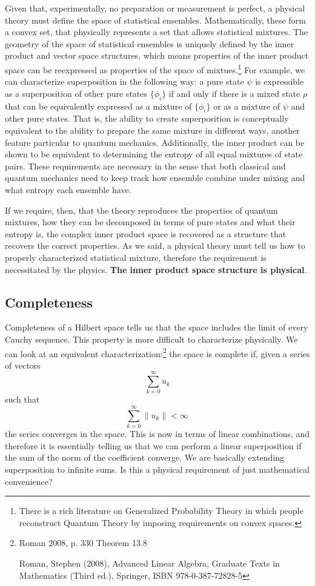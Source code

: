 \documentclass[10pt,twocolumn, nofootinbib]{revtex4-2}
\begin{document}
Given that, experimentally, no preparation or measurement is perfect, a physical theory must define the space of statistical ensembles. Mathematically, these form a convex set, that physically represents a set that allows statistical mixtures. The geometry of the space of statistical ensembles is uniquely defined by the inner product and vector space structures, which means properties of the inner product space can be reexpressed as properties of the space of mixtues.\footnote{There is a rich literature on Generalized Probability Theory in which people reconstruct Quantum Theory by imposing requirements on convex spaces.} For example, we can characterize superposition in the following way: a pure state $\psi$ is expressible as a superposition of other pure states $\{\phi_i\}$ if and only if there is a mixed state $\rho$ that can be equivalently expressed as a mixture of $\{\phi_i\}$ or as a mixture of $\psi$ and other pure states. That is, the ability to create superposition is conceptually equivalent to the ability to prepare the same mixture in different ways, another feature particular to quantum mechanics. Additionally, the inner product can be shown to be equivalent to determining the entropy of all equal mixtures of state pairs. These requirements are necessary in the sense that both classical and quantum mechanics need to keep track how ensemble combine under mixing and what entropy each ensemble have.

If we require, then, that the theory reproduces the properties of quantum mixtures, how they can be decomposed in terms of pure states and what their entropy is, the complex inner product space is recovered as a structure that recovers the correct properties. As we said, a physical theory must tell us how to properly characterized statistical mixture, therefore the requirement is necessitated by the physics. \textbf{The inner product space structure is physical}.

\subsection{Completeness}

Completeness of a Hilbert space tells us that the space includes the limit of every Cauchy sequence. This property is more difficult to characterize physically. We can look at an equivalent characterization:\footnote{Roman 2008, p. 330 Theorem 13.8
	
	Roman, Stephen (2008), Advanced Linear Algebra, Graduate Texts in Mathematics (Third ed.), Springer, ISBN 978-0-387-72828-5} the space is complete if, given a series of vectors
$$ \sum _{k=0}^{\infty }u_{k}$$
such that
$$ \sum _{k=0}^{\infty }\|u_{k}\|<\infty \,$$
the series converges in the space. This is now in terms of linear combinations, and therefore it is essentially telling us that we can perform a linear superposition if the sum of the norm of the coefficient converge. We are basically extending superposition to infinite sums. Is this a physical requirement of just mathematical convenience?
\end{document}
